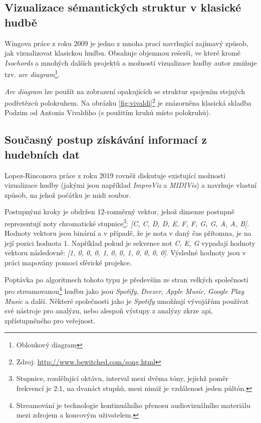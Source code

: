 \documentclass[thesis=B, czech]{FITthesis}[2019/03/06]
\begin{document}
\subsection*{Vizualizace sémantických struktur v klasické hudbě}
Wingova práce \cite{Wing} z roku 2009 je jedno z mnoha prací navrhující zajímavý způsob, jak vizualizovat klasickou hudbu. Obsahuje objemnou rešerši, ve které kromě \textit{Isochords} a mnohých dalších projektů a možností vizualizace hudby autor zmiňuje tzv. \textit{arc diagram}\footnote{Obloukový diagram}.

\textit{Arc diagram} lze použít na zobrazení opakujících se struktur spojením stejných podřetězců polokruhem. Na obrázku \ref{fig:vivaldi}\footnote{Zdroj: \url{http://www.bewitched.com/song.html}} je znázorněna klasická skladba Podzim od Antonia Vivaldiho (s použitím kruhů místo polokruhů).



\newpage

\subsection*{Současný postup získávání informací z hudebních dat} \label{chroma}


Lopez-Rinconova práce \cite{Rincon} z roku 2019 rovněž diskutuje existující možnosti vizualizace hudby (jakými jsou například \textit{ImproViz} a \textit{MIDIVis}) a navrhuje vlastní způsob, na jehož počátku je \gls{midi} soubor. 

Postupnými kroky je obdržen 12-rozměrný vektor, jehož dimenze postupně reprezentují noty chromatické stupnice\footnote{Stupnice, rozdělující oktávu, interval mezi dvěma tóny, jejichž poměr frekvencí je 2:1, na dvanáct stupňů, mezi nimiž je vzdálenost jeden půltón.}: \textit{[C, C\sh, D, D\sh, E, F, F\sh, G, G\sh, A, A\sh, B]}. Hodnoty vektoru jsou binární a v případě, že je nota v daný čas přítomna, je na její pozici hodnota 1. Například pokud je sekvence not \textit{C, E, G} vypadají hodnoty vektoru následovně: \textit{[1, 0, 0, 0, 1, 0, 0, 1, 0, 0, 0, 0]}. Výsledné hodnoty jsou v práci mapovány pomocí sférické projekce.

Poptávka po algoritmech tohoto typu je především ze stran velkých společností pro streamovanou\footnote{Streamování je technologie kontinuálního přenosu audiovizuálního materiálu mezi zdrojem a koncovým uživatelem.} hudbu jako jsou \textit{Spotify}, \textit{Deezer}, \textit{Apple Music}, \textit{Google Play Music} a další. Některé společnosti jako je \textit{Spotify} umožňují vývojářům používat své nástroje pro analýzu, nebo alespoň výstupy z analýzy zkrze \gls{api}, zpřístupněného pro veřejnost.
\end{document}
